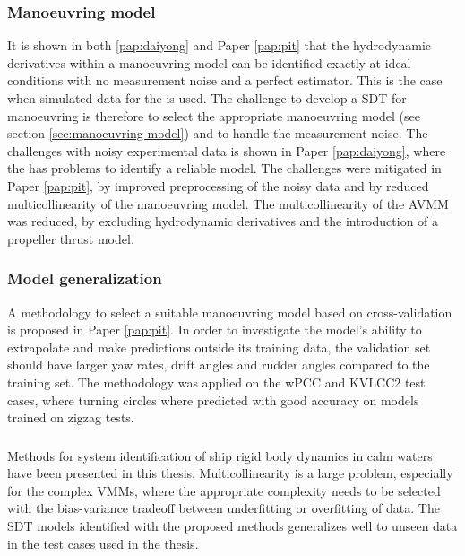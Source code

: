 \subsubsection*{Manoeuvring model}
It is shown in both \ref{pap:daiyong} and Paper \ref{pap:pit} that the hydrodynamic derivatives within a manoeuvring model can be identified exactly at ideal conditions with no measurement noise and a perfect estimator. This is the case when simulated data for the  is used.
The challenge to develop a SDT for manoeuvring is therefore to select the appropriate manoeuvring model (see section \ref{sec:manoeuvring model}) and to handle the measurement noise.
The challenges with noisy experimental data is shown in Paper \ref{pap:daiyong}, where the  has problems to identify a reliable model. The challenges were mitigated in Paper \ref{pap:pit}, by improved preprocessing of the noisy data and by reduced multicollinearity of the manoeuvring model. The multicollinearity of the AVMM was reduced, by excluding hydrodynamic derivatives and the introduction of a propeller thrust model.

\subsubsection*{Model generalization}
A methodology to select a suitable manoeuvring model based on cross-validation is proposed in Paper \ref{pap:pit}. In order to investigate the model's ability to extrapolate and make predictions outside its training data, the validation set should have larger yaw rates, drift angles and rudder angles compared to the training set. The methodology was applied on the wPCC and KVLCC2 test cases, where turning circles where predicted with good accuracy on models trained on zigzag tests. 

\subsubsection*{}
Methods for system identification of ship rigid body dynamics in calm waters have been presented in this thesis. Multicollinearity is a large problem, especially for the complex VMMs, where the appropriate complexity needs to be selected with the bias-variance tradeoff between underfitting or overfitting of data. The SDT models identified with the proposed methods generalizes well to unseen data in the test cases used in the thesis.